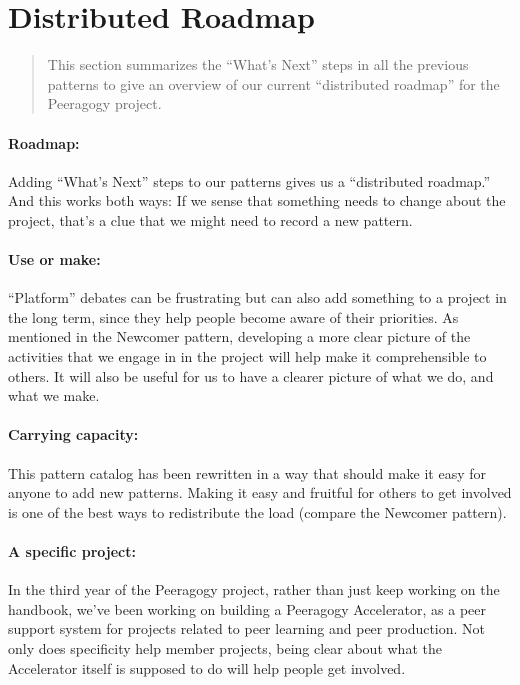 \section{Distributed Roadmap}

\begin{quote}
This section summarizes the ``What's Next'' steps in all the previous
patterns to give an overview of our current ``distributed roadmap''
for the Peeragogy project.
\end{quote}

\paragraph{Roadmap:} Adding ``What's Next'' steps to our patterns gives us a ``distributed roadmap.''  And this works both ways:  
If we sense that something needs to change about the project, that's a
clue that we might need to record a new pattern.
\paragraph{Use or make:} “Platform” debates can be frustrating but can also add something to a project in the long term, since they help people become aware of their
priorities. As mentioned in the Newcomer pattern, developing a more clear
picture of the activities that we engage in in the project will help
make it comprehensible to others. It will also be useful for us to have
a clearer picture of what we do, and what we make.

\paragraph{Carrying capacity:} This pattern catalog has been rewritten in a way that should make it
easy for anyone to add new patterns. Making it easy and fruitful for
others to get involved is one of the best ways to redistribute the load
(compare the Newcomer pattern).

\paragraph{A specific project:} In the third year of the Peeragogy project, rather than just keep
working on the handbook, we’ve been working on building a Peeragogy
Accelerator, as a peer support system for projects related to peer
learning and peer production. Not only does specificity help member
projects, being clear about what the Accelerator itself is supposed to
do will help people get involved.

